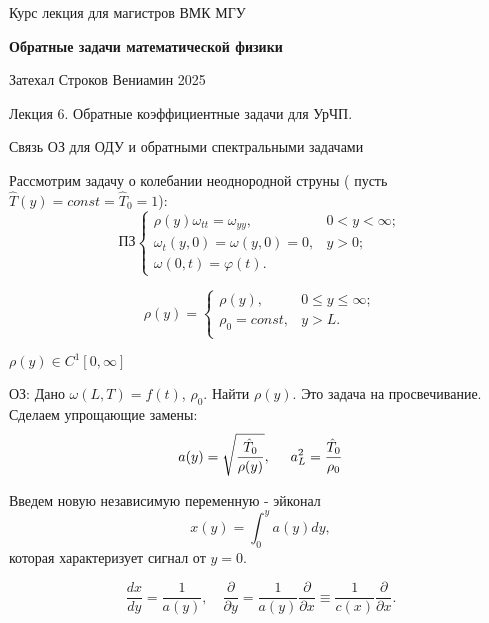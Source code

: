 \documentclass{article}
\begin{document}
\centerline{\large Курс лекция для магистров ВМК МГУ}
\centerline {\textbf{\LARGE Обратные задачи математической физики}}
\centerline {Затехал Строков Вениамин 2025}

\vspace{0.4cm}

\centerline{\LARGE 	Лекция 6. Обратные коэффициентные задачи для УрЧП.}
\centerline{\LARGE Связь ОЗ для ОДУ и обратными спектральными задачами}

\vspace{0.5cm}

Рассмотрим задачу о колебании неоднородной  струны ( пусть $\hat{T}(y) = const = \hat{T}_0 = 1$):
\begin{equation*}
\texttt{ПЗ}
\begin{cases}
	\rho(y) \omega_{tt} = \omega_{yy}, & 0<y<\infty;\\
	\omega_t(y,0) = \omega(y,0) = 0, & y > 0;\\
	\omega(0,t) = \varphi(t).
\end{cases}
\end{equation*}

\begin{equation*}
\rho(y) =
\begin{cases}
	\rho(y), & 0 \leqslant y \leqslant \infty;\\
	\rho_0 = const , & y > L.\\
\end{cases}
\end{equation*}

$\rho(y) \in C^1[0,\infty]$

ОЗ: Дано $\omega(L,T) = f(t)$, $\rho_0$. Найти $\rho(y)$.
Это задача на просвечивание.
Сделаем упрощающие замены:
\begin{equation}
a(y) = \sqrt{\dfrac{\hat{T}_0}{\rho(y)}}, 
\hspace{0.5cm}
a_L^2 = \frac{\hat{T}_0}{\rho_0}
\end{equation}


Введем новую независимую переменную - эйконал
\begin{equation}
    x(y) = \int_0^y a(y) dy,
\end{equation}
которая характеризует сигнал от $y=0$.

\begin{equation*}
    \frac{dx}{dy} = \frac{1}{a(y)}, \quad \frac{\partial}{\partial y} = \frac{1}{a(y)} \frac{\partial}{\partial x} \equiv \frac{1}{c(x)} \frac{\partial}{\partial x}.
\end{equation*}
\end{document}
